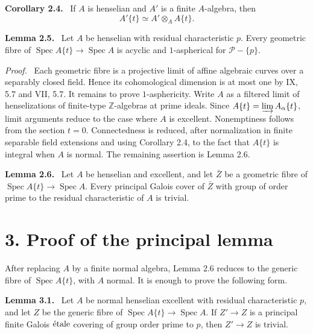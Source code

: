 \documentclass[12pt]{article}
\newcommand{\Zz}{\mathbb{Z}}
\newcommand{\Primes}{\mathcal P}
\newcommand{\Spec}{\operatorname{Spec}}
\newcommand{\etale}{\ifmmode\textnormal{\'etale}\else\'etale\fi}
\newenvironment{statement}[1]{\par\medskip\noindent\textbf{#1.}\ }{\par\medskip}
\newenvironment{prooftext}[1][Proof]{\par\noindent\emph{#1.}\ }{\par\medskip}
\begin{document}
\begin{statement}{Corollary 2.4}
If \(A\) is henselian and \(A'\) is a finite \(A\)-algebra, then
\[
A'\{t\}\simeq A'\otimes_A A\{t\}.
\]
\end{statement}

\begin{statement}{Lemma 2.5}
Let \(A\) be henselian with residual characteristic \(p\). Every geometric fibre of \(\Spec A\{t\}\to\Spec A\) is acyclic and \(1\)-aspherical for \(\Primes-\{p\}\).
\end{statement}

\begin{prooftext}
Each geometric fibre is a projective limit of affine algebraic curves over a separably closed field. Hence its cohomological dimension is at most one by IX, 5.7 and VII, 5.7. It remains to prove \(1\)-asphericity. Write \(A\) as a filtered limit of henselizations of finite-type \(\Zz\)-algebras at prime ideals. Since \(A\{t\}=\varinjlim A_\alpha\{t\}\), limit arguments reduce to the case where \(A\) is excellent. Nonemptiness follows from the section \(t=0\). Connectedness is reduced, after normalization in finite separable field extensions and using Corollary 2.4, to the fact that \(A\{t\}\) is integral when \(A\) is normal. The remaining assertion is Lemma 2.6.
\end{prooftext}

\begin{statement}{Lemma 2.6}
Let \(A\) be henselian and excellent, and let \(\bar Z\) be a geometric fibre of \(\Spec A\{t\}\to\Spec A\). Every principal Galois cover of \(\bar Z\) with group of order prime to the residual characteristic of \(A\) is trivial.
\end{statement}

\section*{3. Proof of the principal lemma}

After replacing \(A\) by a finite normal algebra, Lemma 2.6 reduces to the generic fibre of \(\Spec A\{t\}\), with \(A\) normal. It is enough to prove the following form.

\begin{statement}{Lemma 3.1}
Let \(A\) be normal henselian excellent with residual characteristic \(p\), and let \(Z\) be the generic fibre of \(\Spec A\{t\}\to\Spec A\). If \(Z'\to Z\) is a principal finite Galois \(\etale\) covering of group order prime to \(p\), then \(Z'\to Z\) is trivial.
\end{statement}
\end{document}
